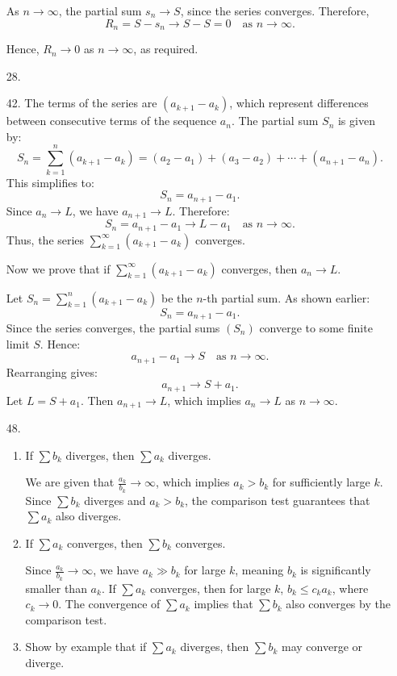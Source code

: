 \documentclass[12pt]{article}
\begin{document}
\begin{enumerate}
As \(n \to \infty\), the partial sum \(s_n \to S\), since the series converges. Therefore,
\[
R_n = S - s_n \to S - S = 0 \quad \text{as } n \to \infty.
\]

Hence, \(R_n \to 0\) as \(n \to \infty\), as required.

\item [28. ]
\item [42. ]
The terms of the series are \((a_{k+1} - a_k)\), which represent differences between consecutive terms of the sequence \(a_n\). The partial sum \(S_n\) is given by:
\[
S_n = \sum_{k=1}^n (a_{k+1} - a_k) = (a_2 - a_1) + (a_3 - a_2) + \cdots + (a_{n+1} - a_n).
\]
This simplifies to:
\[
S_n = a_{n+1} - a_1.
\]
Since \(a_n \to L\), we have \(a_{n+1} \to L\). Therefore:
\[
S_n = a_{n+1} - a_1 \to L - a_1 \quad \text{as } n \to \infty.
\]
Thus, the series \(\sum_{k=1}^\infty (a_{k+1} - a_k)\) converges.

Now we prove that if \(\sum_{k=1}^\infty (a_{k+1} - a_k)\) converges, then \(a_n \to L\).

Let \(S_n = \sum_{k=1}^n (a_{k+1} - a_k)\) be the \(n\)-th partial sum. As shown earlier:
\[
S_n = a_{n+1} - a_1.
\]
Since the series converges, the partial sums \((S_n)\) converge to some finite limit \(S\). Hence:
\[
a_{n+1} - a_1 \to S \quad \text{as } n \to \infty.
\]
Rearranging gives:
\[
a_{n+1} \to S + a_1.
\]
Let \(L = S + a_1\). Then \(a_{n+1} \to L\), which implies \(a_n \to L\) as \(n \to \infty\).

\item [48. ]
\begin{enumerate}
    \item If $\sum b_k$ diverges, then $\sum a_k$ diverges.

    We are given that $\frac{a_k}{b_k} \to \infty$, which implies $a_k > b_k$ for sufficiently large $k$. Since $\sum b_k$ diverges and $a_k > b_k$, the comparison test guarantees that $\sum a_k$ also diverges.

    \item If $\sum a_k$ converges, then $\sum b_k$ converges.

    Since $\frac{a_k}{b_k} \to \infty$, we have $a_k \gg b_k$ for large $k$, meaning $b_k$ is significantly smaller than $a_k$. If $\sum a_k$ converges, then for large $k$, $b_k \leq c_k a_k$, where $c_k \to 0$. The convergence of $\sum a_k$ implies that $\sum b_k$ also converges by the comparison test.

    \item Show by example that if $\sum a_k$ diverges, then $\sum b_k$ may converge or diverge.


\end{enumerate}
\end{enumerate}
\end{document}
